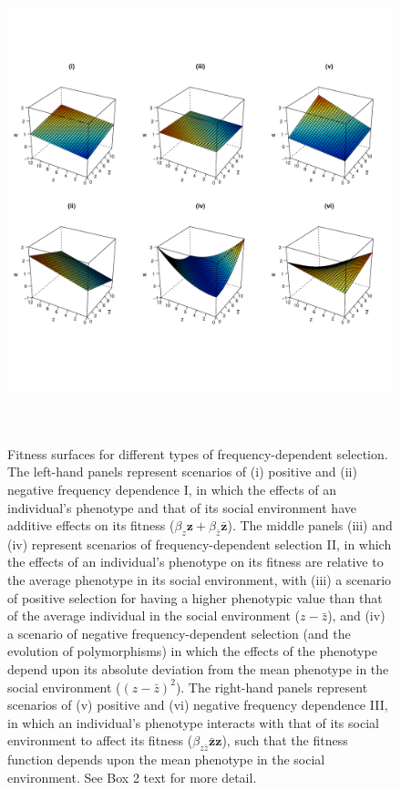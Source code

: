 \documentclass{article}
\begin{document}
	\begin{figure}[H] 
		\renewcommand{\figurename}{Figure B2.}
		\centering
		\includegraphics[width=14cm, height=14cm]{Figures/Box2.pdf}
		\let\nobreakspace\relax
		\caption{Fitness surfaces for different types of frequency-dependent selection. The left-hand panels represent scenarios of (i) positive and (ii) negative frequency dependence I, in which the effects of an individual's phenotype and that of its social environment have additive effects on its fitness ($\beta_z \mathbf{z} + \beta_{\bar{z}} \mathbf{\bar{z}}$). The middle panels (iii) and (iv) represent scenarios of frequency-dependent selection II, in which the effects of an individual's phenotype on its fitness are relative to the average phenotype in its social environment, with (iii) a scenario of positive selection for having a higher phenotypic value than that of the average individual in the social environment ($z-\bar{z}$), and (iv) a scenario of negative frequency-dependent selection (and the evolution of polymorphisms) in which the effects of the phenotype depend upon its absolute deviation from the mean phenotype in the social environment ($(z-\bar{z})^2$). The right-hand panels represent scenarios of (v) positive and (vi) negative frequency dependence III, in which an individual's phenotype interacts with that of its social environment to affect its fitness ($\beta_{z\bar{z}} \mathbf{\bar{z}z}$), such that the fitness function depends upon the mean phenotype in the social environment. See Box 2 text for more detail.}
		
	\end{figure}
	
\end{document}
